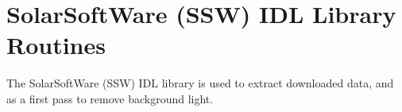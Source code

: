 \section{SolarSoftWare (SSW) IDL Library Routines}\label{appendix_ssw}
The SolarSoftWare (SSW) IDL library is used to extract downloaded data, and as a first pass to remove background light.